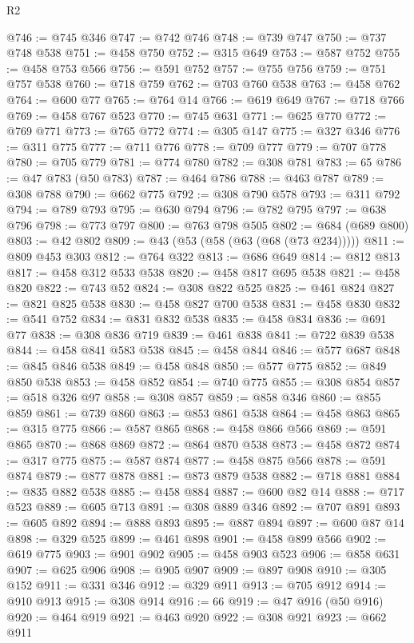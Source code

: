 \begin{lexlean}{R2}
\begin{coremodule}
@746 := @745 @346
@747 := @742 @746
@748 := @739 @747
@750 := @737 @748 @538
@751 := @458 @750
@752 := @315 @649
@753 := @587 @752
@755 := @458 @753 @566
@756 := @591 @752
@757 := @755 @756
@759 := @751 @757 @538
@760 := @718 @759
@762 := @703 @760 @538
@763 := @458 @762
@764 := @600 @77
@765 := @764 @14
@766 := @619 @649
@767 := @718 @766
@769 := @458 @767 @523
@770 := @745 @631
@771 := @625 @770
@772 := @769 @771
@773 := @765 @772
@774 := @305 @147
@775 := @327 @346
@776 := @311 @775
@777 := @711 @776
@778 := @709 @777
@779 := @707 @778
@780 := @705 @779
@781 := @774 @780
@782 := @308 @781
@783 := 65
@786 := @47 @783 (@50 @783)
@787 := @464 @786
@788 := @463 @787
@789 := @308 @788
@790 := @662 @775
@792 := @308 @790 @578
@793 := @311 @792
@794 := @789 @793
@795 := @630 @794
@796 := @782 @795
@797 := @638 @796
@798 := @773 @797
@800 := @763 @798 @505
@802 := @684 (@689 @800)
@803 := @42 @802
@809 := @43 (@53 (@58 (@63 (@68 (@73 @234)))))
@811 := @809 @453 @303
@812 := @764 @322
@813 := @686 @649
@814 := @812 @813
@817 := @458 @312 @533 @538
@820 := @458 @817 @695 @538
@821 := @458 @820
@822 := @743 @52
@824 := @308 @822 @525
@825 := @461 @824
@827 := @821 @825 @538
@830 := @458 @827 @700 @538
@831 := @458 @830
@832 := @541 @752
@834 := @831 @832 @538
@835 := @458 @834
@836 := @691 @77
@838 := @308 @836 @719
@839 := @461 @838
@841 := @722 @839 @538
@844 := @458 @841 @583 @538
@845 := @458 @844
@846 := @577 @687
@848 := @845 @846 @538
@849 := @458 @848
@850 := @577 @775
@852 := @849 @850 @538
@853 := @458 @852
@854 := @740 @775
@855 := @308 @854
@857 := @518 @326 @97
@858 := @308 @857
@859 := @858 @346
@860 := @855 @859
@861 := @739 @860
@863 := @853 @861 @538
@864 := @458 @863
@865 := @315 @775
@866 := @587 @865
@868 := @458 @866 @566
@869 := @591 @865
@870 := @868 @869
@872 := @864 @870 @538
@873 := @458 @872
@874 := @317 @775
@875 := @587 @874
@877 := @458 @875 @566
@878 := @591 @874
@879 := @877 @878
@881 := @873 @879 @538
@882 := @718 @881
@884 := @835 @882 @538
@885 := @458 @884
@887 := @600 @82 @14
@888 := @717 @523
@889 := @605 @713
@891 := @308 @889 @346
@892 := @707 @891
@893 := @605 @892
@894 := @888 @893
@895 := @887 @894
@897 := @600 @87 @14
@898 := @329 @525
@899 := @461 @898
@901 := @458 @899 @566
@902 := @619 @775
@903 := @901 @902
@905 := @458 @903 @523
@906 := @858 @631
@907 := @625 @906
@908 := @905 @907
@909 := @897 @908
@910 := @305 @152
@911 := @331 @346
@912 := @329 @911
@913 := @705 @912
@914 := @910 @913
@915 := @308 @914
@916 := 66
@919 := @47 @916 (@50 @916)
@920 := @464 @919
@921 := @463 @920
@922 := @308 @921
@923 := @662 @911

\end{coremodule}
\end{lexlean}
